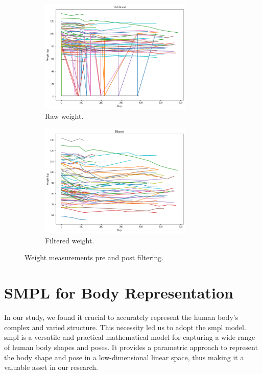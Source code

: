 \begin{figure}[h]
	\centering
	\begin{subfigure}{\textwidth}
		\centering
		\includegraphics[width=0.8\textwidth]{files/weight_unfiltered}
		\caption{Raw weight.}
	\end{subfigure}
	\begin{subfigure}{\textwidth}
		\centering
		\includegraphics[width=0.8\textwidth]{files/weight_filtered}
		\caption{Filtered weight.}
	\end{subfigure}
	\caption{Weight measurements pre and post filtering.}
\end{figure}

\section{SMPL for Body Representation}

In our study, we found it crucial to accurately represent the human body's
complex and varied structure. This necessity led us to adopt the \gls{smpl}
model. \gls{smpl} is a versatile and practical mathematical model for capturing
a wide range of human body shapes and poses. It provides a parametric approach
to represent the body shape and pose in a low-dimensional linear space, thus
making it a valuable asset in our research.

